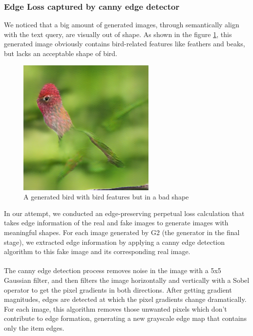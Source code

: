\documentclass[10pt,twocolumn,letterpaper]{article}
\begin{document}
 \subsubsection{Edge Loss captured by canny edge detector}
 We noticed that a big amount of generated images, through semantically align with the text query, are visually out of shape. As shown in the figure \ref{niao}, this generated image obviously contains bird-related features like feathers and beaks, but lacks an acceptable shape of bird. 

\begin{figure}[htp]
    \centering
    \includegraphics[width=0.56\columnwidth]{bd1.png}
    \caption{A generated bird with bird features but in a bad shape }
    \label{niao}
\end{figure}

\noindent In our attempt, we conducted an edge-preserving perpetual loss calculation that takes edge information of the real and fake images to generate images with meaningful shapes. For each image generated by G2 (the generator in the final stage), we extracted edge information by applying a canny edge detection algorithm to this fake image and its corresponding real image. 
\\\\
The canny edge detection process removes noise in the image with a 5x5 Gaussian filter, and then filters the image horizontally and vertically with a Sobel operator to get the pixel gradients in both directions. After getting gradient magnitudes, edges are detected at which the pixel gradients change dramatically. For each image, this algorithm removes those unwanted pixels which don’t contribute to edge formation, generating a new grayscale edge map that contains only the item edges. 
\end{document}
